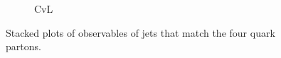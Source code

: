 \begin{figure}[H]
\begin{subfigure}{0.435\linewidth}
        \caption{\DeepJet CvL}
    \end{subfigure}  
    \caption{Stacked plots of observables of jets that match the four quark partons.}
    \label{fig:jets_stack}
\end{figure}